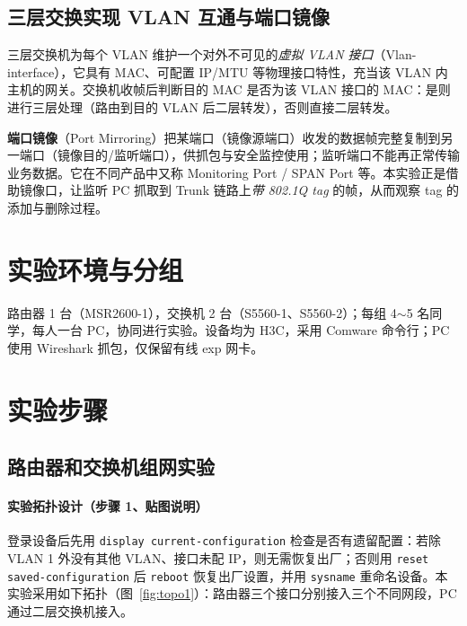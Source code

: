 \documentclass[12pt,a4paper]{article}
\begin{document}
\subsection{三层交换实现 VLAN 互通与端口镜像}
三层交换机为每个 VLAN 维护一个对外不可见的\emph{虚拟 VLAN 接口}（Vlan-interface），它具有 MAC、可配置 IP/MTU 等物理接口特性，充当该 VLAN 内主机的网关。交换机收帧后判断目的 MAC 是否为该 VLAN 接口的 MAC：是则进行三层处理（路由到目的 VLAN 后二层转发），否则直接二层转发。

\textbf{端口镜像}（Port Mirroring）把某端口（镜像源端口）收发的数据帧完整复制到另一端口（镜像目的/监听端口），供抓包与安全监控使用；监听端口不能再正常传输业务数据。它在不同产品中又称 Monitoring Port / SPAN Port 等。本实验正是借助镜像口，让监听 PC 抓取到 Trunk 链路上\emph{带 802.1Q tag} 的帧，从而观察 tag 的添加与删除过程。

\section{实验环境与分组}
路由器 1 台（MSR2600-1），交换机 2 台（S5560-1、S5560-2）；每组 4$\sim$5 名同学，每人一台 PC，协同进行实验。设备均为 H3C，采用 Comware 命令行；PC 使用 Wireshark 抓包，仅保留有线 exp 网卡。

\section{实验步骤}

\subsection{路由器和交换机组网实验}

\paragraph{实验拓扑设计（步骤 1、贴图说明）}
登录设备后先用 \lstinline|display current-configuration| 检查是否有遗留配置：若除 VLAN 1 外没有其他 VLAN、接口未配 IP，则无需恢复出厂；否则用 \lstinline|reset saved-configuration| 后 \lstinline|reboot| 恢复出厂设置，并用 \lstinline|sysname| 重命名设备。本实验采用如下拓扑（图~\ref{fig:topo1}）：路由器三个接口分别接入三个不同网段，PC 通过二层交换机接入。
\end{document}
